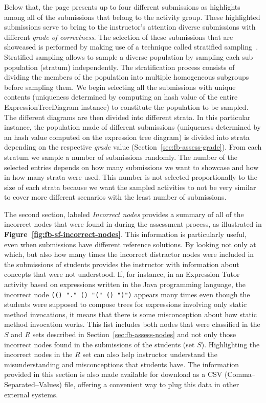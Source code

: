\begin{chapterBody}
Below that, the page presents up to four different submissions as highlights
among all of the submissions that belong to the activity group. These
highlighted submissions serve to bring to the instructor's attention diverse
submissions with different \textit{grade of correctness}. The selection of
these submissions that are showcased is performed by making use of a technique
called stratified sampling~\cite{parsons_stratified_2017}.
Stratified sampling allows to sample a diverse population by sampling
each sub–population (stratum) independently. The stratification process
consists of dividing the members of the population into multiple homogeneous
subgroups before sampling them.
We begin selecting all the submissions with unique contents (uniqueness
determined by computing an hash value of the entire ExpressionTreeDiagram
instance) to constitute the population to be sampled. The different diagrams
are then divided into different strata. 
In this particular instance, the population made of different submissions
(uniqueness determined by an hash value computed on the expression tree diagram)
is divided into strata depending on the respective \textit{grade} value
(Section~\ref{sec:fb-assess-grade}). From each stratum we sample a number of
submissions randomly. The number of the selected entries depends on how many
submissions we want to showcase and how in how many strata were used.
This number is not selected proportionally to the size of each strata
because we want the sampled activities to not be very similar to cover more
different scenarios with the least number of submissions.

The second section, labeled \textit{Incorrect nodes} provides a summary of all
of the incorrect nodes that were found in during the assessment process, as
illustrated in \textbf{Figure~\ref{fig:fb-sf-incorrect-nodes}}. This information
is particularly useful, even when submissions have different reference 
solutions.
By looking not only at which, but also how many times the incorrect distractor
nodes were included in the submissions of students provides the instructor with
information about concepts that were not understood. If, for instance, in an
Expression Tutor activity based on expressions written in the Java programming
language, the incorrect node \lstinline[language=etl]{(() "." () "(" () ")")}
appears many times even though the students were supposed to compose trees for
expressions involving only static method invocations, it means that there is 
some misconception about how static method invocation works. This list includes
both nodes that were classified in the $ S $ and $ R $ sets described in
Section~\ref{sec:fb-assess-nodes} and not only those incorrect nodes found in 
the submissions of the students (set $ S $). Highlighting the incorrect nodes 
in the $ R $ set can also help instructor understand the misunderstanding and
misconceptions that students have. The information provided in this section is
also made available for download as a CSV (Comma–Separated–Values) file,
offering a convenient way to plug this data in other external systems.


\end{chapterBody}
